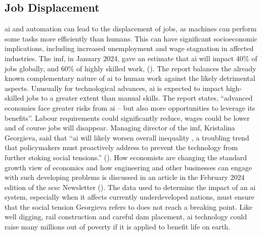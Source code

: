\subsection{Job Displacement}
\Gls{ai} and automation can lead to the displacement of jobs, as machines can perform some tasks more efficiently than humans. This can have significant socioeconomic implications, including increased unemployment and wage stagnation in affected industries. The \gls{imf}, in January 2024, gave an estimate that \gls{ai} will impact 40\% of jobs globally, and 60\% of highly skilled work, (\cite{citation:Cazziniga2024}). The report balances the already known complementary nature of \gls{ai} to human work against the likely detrimental aspects. Unusually for technological advances, \gls{ai} is expected to impact high-skilled jobs to a greater extent than manual skills. The report states, ``advanced economies face greater risks from \gls{ai} -- but also more opportunities to leverage its benefits''. Labour requirements could significantly reduce, wages could be lower and of course jobs will disappear.  Managing director of the \gls{imf}, Kristalina Georgieva, said that ``\gls{ai} will likely worsen overall inequality , a troubling trend that policymakers must proactively address to prevent the technology from further stoking social tensions.'' (\cite{citation:toh2024}). How economists are changing the standard growth view of economics and how engineering and other businesses can engage with such  developing problems is discussed in an article in the February 2024 edition of the \gls{scsc} Newsletter (\cite{citation:SCSC193}). The data used to determine the impact of an \gls{ai} system, especially when it affects currently underdeveloped nations, must ensure that the social tension Georgieva refers to does not reach a breaking point. Like well digging, rail construction and careful dam placement, \gls{ai} technology could raise many millions out of poverty if it is applied to benefit life on earth.

